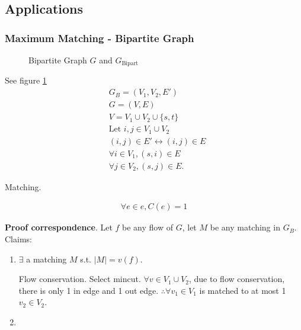 \documentclass[a4paper]{report}
\theoremstyle{definition}
\begin{document}
\subsection{Applications}
\subsubsection{Maximum Matching - Bipartite Graph}
\begin{figure}[!htp]
\centering
{}
\caption{Bipartite Graph $G$ and $G_\text{Bipart}$}
\label{fig:bipart}
\end{figure}
See figure \ref{fig:bipart}
\begin{align*}
& G_B = (V_1, V_2, E') \\
& G=(V, E) \\
& V= V_1 \cup V_2\cup \{s, t\}\\
& \text{Let } i, j \in V_1 \cup V_2\\
& (i,j)\in E' \leftrightarrow (i, j)\in E\\
& \forall i \in V_1, (s, i) \in E \\
& \forall j \in V_2, (s, j) \in E.
\end{align*}

Matching.

\begin{align*}
\forall e \in e, C(e) =1
\end{align*}

\textbf{Proof correspondence}. Let $f$ be any flow of $G$, let $M$ be any matching in $G_B$. Claims:
\begin{enumerate}
\item $\exists$ a matching $M$ s.t. $|M|=v(f)$.

Flow conservation. Select mincut. $\forall v \in V_1\cup V_2$, due to flow conservation, there is only 1 in edge and 1 out edge. $\therefore \forall v_1 \in V_1$ is matched to at most 1 $v_2 \in V_2. $
\item
\end{enumerate}
\end{document}
